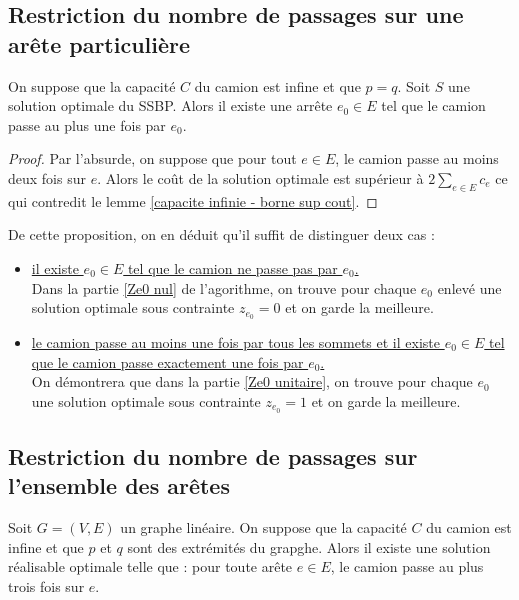 \subsection{Restriction du nombre de passages sur une arête particulière}

\begin{prop}
On suppose que la capacité $C$ du camion est infine et que $p=q$. Soit $S$ une solution optimale du SSBP. Alors il existe une arrête $e_0 \in E$ tel que le camion passe au plus une fois par $e_0$.
\end{prop}

\begin{proof}
Par l'absurde, on suppose que pour tout $e \in E$, le camion passe au moins deux fois sur $e$. Alors le coût de la solution optimale est supérieur à $2\sum_{e \in E}c_e$ ce qui contredit le lemme \ref{capacite infinie - borne sup cout}.
\end{proof}

De cette proposition, on en déduit qu'il suffit de distinguer deux cas :
\begin{itemize}
\item \uline{il existe $e_0 \in E$ tel que le camion ne passe pas par $e_0$.}\\
Dans la partie \ref{Ze0 nul} de l'agorithme, on trouve pour chaque $e_0$ enlevé une solution optimale sous contrainte $z_{e_0} = 0$ et on garde la meilleure.
\item \uline{le camion passe au moins une fois par tous les sommets et il existe $e_0 \in E$ tel que le camion passe exactement une fois par $e_0$.}\\
On démontrera que dans la partie \ref{Ze0 unitaire}, on trouve pour chaque $e_0$ une solution optimale sous contrainte $z_{e_0} = 1$ et on garde la meilleure.
\end{itemize}

\subsection{Restriction du nombre de passages sur l'ensemble des arêtes}

\begin{prop}\label{Ze inf 3 - lineaire}
Soit $G=(V,E)$ un graphe linéaire. On suppose que la capacité $C$ du camion est infine et que $p$ et $q$ sont des extrémités du grapghe. Alors il existe une solution réalisable optimale telle que : pour toute arête $e \in E$, le camion passe au plus trois fois sur $e$.
\end{prop}

